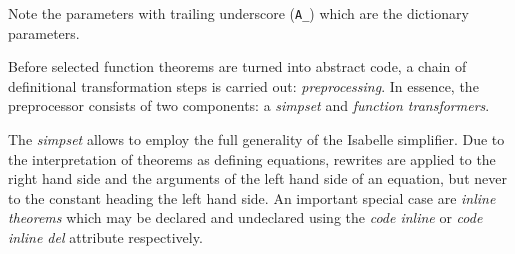 \begin{isabellebody}
\begin{isamarkuptext}
\end{isamarkuptext}%
\isamarkuptrue%
%
\endisatagquoteme
{\isafoldquoteme}%
%
\isadelimquoteme
%
\endisadelimquoteme
%
\begin{isamarkuptext}%
\noindent Note the parameters with trailing underscore (\verb|A_|)
    which are the dictionary parameters.%
\end{isamarkuptext}%
\isamarkuptrue%
%
\isamarkuptrue%
%
\begin{isamarkuptext}%
Before selected function theorems are turned into abstract
  code, a chain of definitional transformation steps is carried
  out: \emph{preprocessing}.  In essence, the preprocessor
  consists of two components: a \emph{simpset} and \emph{function transformers}.

  The \emph{simpset} allows to employ the full generality of the Isabelle
  simplifier.  Due to the interpretation of theorems
  as defining equations, rewrites are applied to the right
  hand side and the arguments of the left hand side of an
  equation, but never to the constant heading the left hand side.
  An important special case are \emph{inline theorems} which may be
  declared and undeclared using the
  \emph{code inline} or \emph{code inline del} attribute respectively.


\end{isamarkuptext}
\end{isabellebody}
